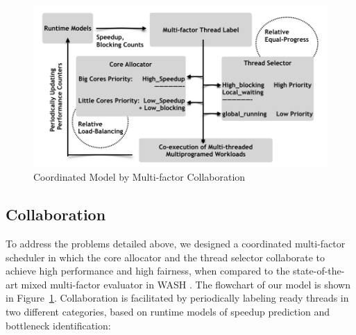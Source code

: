 \documentclass[10pt,conference]{IEEEtran}
\begin{document}

\begin{figure}
\centering
\includegraphics[scale=0.57]{figures/COLAB_M.pdf}
\caption{Coordinated Model by Multi-factor Collaboration}
\label{figure:f2}
\end{figure} 

\subsection{Collaboration}
To address the problems detailed above, we designed a coordinated multi-factor scheduler in which the core allocator and the thread selector collaborate to achieve high performance and high fairness, when compared to the state-of-the-art mixed multi-factor evaluator in WASH \cite{jibaja2016portable}.
The flowchart of our model is shown in Figure~\ref{figure:f2}. 
Collaboration is facilitated by periodically labeling ready threads in two different categories, based on runtime models of speedup prediction and bottleneck identification: 
\end{document}
